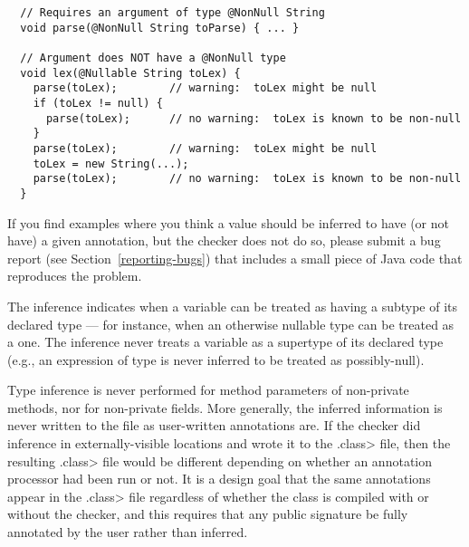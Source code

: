 \begin{Verbatim}
  // Requires an argument of type @NonNull String
  void parse(@NonNull String toParse) { ... }

  // Argument does NOT have a @NonNull type
  void lex(@Nullable String toLex) {
    parse(toLex);        // warning:  toLex might be null
    if (toLex != null) {
      parse(toLex);      // no warning:  toLex is known to be non-null
    }
    parse(toLex);        // warning:  toLex might be null
    toLex = new String(...);
    parse(toLex);        // no warning:  toLex is known to be non-null
  }
\end{Verbatim}

If you find examples where you think a value should be inferred to have
(or not have) a
given annotation, but the checker does not do so, please submit a bug
report (see Section~\ref{reporting-bugs}) that includes a small piece of
Java code that reproduces the problem.

%
%


The inference indicates when a variable can be treated as having a subtype
of its declared type --- for instance, when an otherwise nullable type can be
treated as a  one.  The inference never treats a variable as
a supertype of its declared type (e.g., an expression of 
type is never inferred to be treated as possibly-null).


Type inference is never performed for method parameters of non-private
methods, nor for non-private fields.
More generally, the inferred information is never written to the
 file as user-written annotations are.
If the checker did inference in externally-visible locations and wrote it
to the \<.class> file, then the resulting \<.class> file would be different
depending on whether an annotation processor had been run or not.  It is a
design goal that the same annotations appear in the \<.class> file
regardless of whether the class is compiled with or without the checker,
and this requires that any public signature be fully annotated by the user
rather than inferred.


